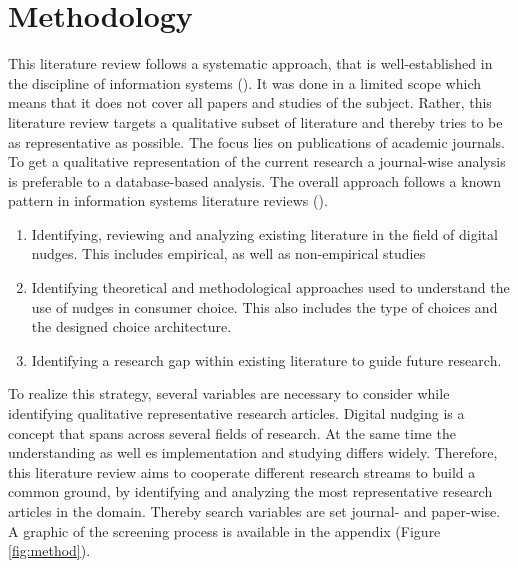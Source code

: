 \section{Methodology}

This literature review follows a systematic approach, that is well-established in the discipline of information systems (\cite{webster_analyzing_2002}). It was done in a limited scope which means that it does not cover all papers and studies of the subject. Rather, this literature review targets a qualitative subset of literature and thereby tries to be as representative as possible. The focus lies on publications of academic journals. To get a qualitative representation of the current research a journal-wise analysis is preferable to a database-based analysis. The overall approach follows a known pattern in information systems literature reviews (\cite{alavi_review_1992}).
\begin{enumerate}
\item Identifying, reviewing and analyzing existing literature in the field of digital nudges. This includes empirical, as well as non-empirical studies
\item Identifying theoretical and methodological approaches used to understand the use of nudges in consumer choice. This also includes the type of choices and the designed choice architecture.
\item Identifying a research gap within existing literature to guide future research.
\end{enumerate}

To realize this strategy, several variables are necessary to consider while identifying qualitative representative research articles. Digital nudging is a concept that spans across several fields of research. At the same time the understanding as well es implementation and studying differs widely. Therefore, this literature review aims to cooperate  different research streams to build a common ground, by identifying and analyzing the most representative research articles in the domain. Thereby search variables are set journal- and paper-wise. A graphic of the screening process is available in the appendix (Figure \ref{fig:method}).

